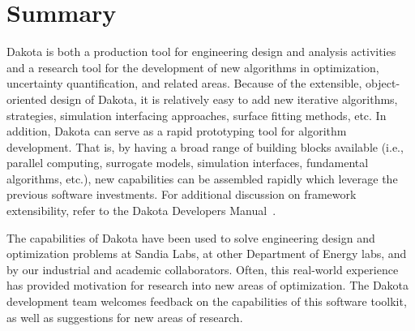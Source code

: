 \section{Summary}\label{intro:summary}

Dakota is both a production tool for engineering design and analysis
activities and a research tool for the development of new algorithms
in optimization, uncertainty quantification, and related areas.
Because of the extensible, object-oriented design of Dakota, it is
relatively easy to add new iterative algorithms, strategies,
simulation interfacing approaches, surface fitting methods, etc. In
addition, Dakota can serve as a rapid prototyping tool for algorithm
development. That is, by having a broad range of building blocks
available (i.e., parallel computing, surrogate models, simulation
interfaces, fundamental algorithms, etc.), new capabilities can be
assembled rapidly which leverage the previous software investments.
For additional discussion on framework extensibility, refer to the
Dakota Developers Manual~\cite{DevMan}.

The capabilities of Dakota have been used to solve engineering design
and optimization problems at Sandia Labs, at other Department of
Energy labs, and by our industrial and academic collaborators. Often,
this real-world experience has provided motivation for research into
new areas of optimization. The Dakota development team welcomes
feedback on the capabilities of this software toolkit, as well as
suggestions for new areas of research.

